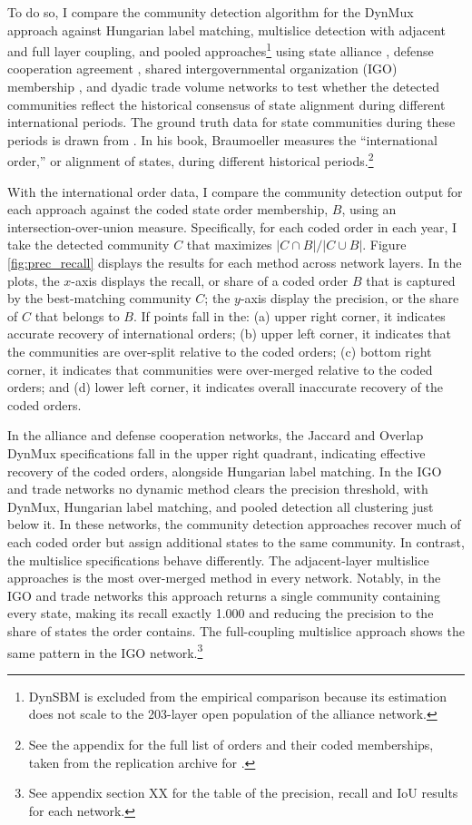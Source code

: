\documentclass[11pt, letterpaper]{article}
\begin{document}
To do so, I compare the community detection algorithm for the DynMux approach against Hungarian label matching, multislice detection with adjacent and full layer coupling, and pooled approaches\footnote{DynSBM is excluded from the empirical comparison because its estimation does not scale to the 203-layer open population of the alliance network.} using state alliance \citep{leeds2002alliance}, defense cooperation agreement \citep{kinne2020defense}, shared intergovernmental organization (IGO) membership \citep{pevehouse2020tracking, wallace1970intergovernmental}, and dyadic trade volume \citep{barbieri2009trading} networks to test whether the detected communities reflect the historical consensus of state alignment during different international periods. The ground truth data for state communities during these periods is drawn from \cite{braumoeller2019only}. In his book, Braumoeller measures the ``international order,'' or alignment of states, during different historical periods.\footnote{See the appendix for the full list of orders and their coded memberships, taken from the replication archive for \cite{braumoeller2019only}.} 

With the international order data, I compare the community detection output for each approach against the coded state order membership, $B$, using an intersection-over-union measure. Specifically, for each coded order in each year, I take the detected community $C$ that maximizes $|C\cap B|/|C\cup B|$. Figure \ref{fig:prec_recall} displays the results for each method across network layers. In the plots, the $x$-axis displays the recall, or share of a coded order $B$ that is captured by the best-matching community $C$; the $y$-axis display the precision, or the share of $C$ that belongs to $B$. If points fall in the: (a) upper right corner, it indicates accurate recovery of international orders; (b) upper left corner, it indicates that the communities are over-split relative to the coded orders; (c) bottom right corner, it indicates that communities were over-merged relative to the coded orders; and (d) lower left corner, it indicates overall inaccurate recovery of the coded orders. 

In the alliance and defense cooperation networks, the Jaccard and Overlap DynMux specifications fall in the upper right quadrant, indicating effective recovery of the coded orders, alongside Hungarian label matching. In the IGO and trade networks no dynamic method clears the precision threshold, with DynMux, Hungarian label matching, and pooled detection all clustering just below it. In these networks, the community detection approaches recover much of each coded order but assign additional states to the same community. In contrast, the multislice specifications behave differently. The adjacent-layer multislice approaches is the most over-merged method in every network. Notably, in the IGO and trade networks this approach returns a single community containing every state, making its recall exactly 1.000 and reducing the precision to the share of states the order contains. The full-coupling multislice approach shows the same pattern in the IGO network.\footnote{See appendix section XX for the table of the precision, recall and IoU results for each network.} 
\end{document}
